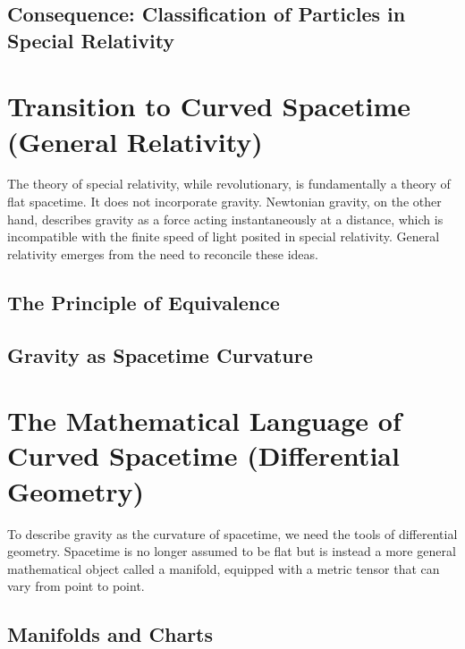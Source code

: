\documentclass{amsart}
\theoremstyle{definition}
\theoremstyle{remark}
\begin{document}
\subsection{Consequence: Classification of Particles in Special Relativity}
\label{subsec:particle_classification_sr}


\section{Transition to Curved Spacetime (General Relativity)}
\label{sec:transition_gr}
The theory of special relativity, while revolutionary, is fundamentally a theory of flat spacetime. It does not incorporate gravity. Newtonian gravity, on the other hand, describes gravity as a force acting instantaneously at a distance, which is incompatible with the finite speed of light posited in special relativity. General relativity emerges from the need to reconcile these ideas.

\subsection{The Principle of Equivalence}

\subsection{Gravity as Spacetime Curvature}

\section{The Mathematical Language of Curved Spacetime (Differential Geometry)}
\label{sec:math_gr}
To describe gravity as the curvature of spacetime, we need the tools of differential geometry. Spacetime is no longer assumed to be flat but is instead a more general mathematical object called a manifold, equipped with a metric tensor that can vary from point to point.
\subsection{Manifolds and Charts}
\end{document}

